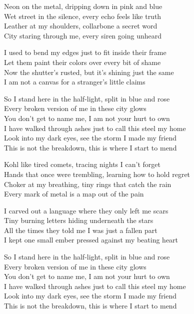\begin{lyrics}
Neon on the metal, dripping down in pink and blue\\
Wet street in the silence, every echo feels like truth\\
Leather at my shoulders, collarbone a secret word\\
City staring through me, every siren going unheard

I used to bend my edges just to fit inside their frame\\
Let them paint their colors over every bit of shame\\
Now the shutter’s rusted, but it’s shining just the same\\
I am not a canvas for a stranger’s little claims

So I stand here in the half-light, split in blue and rose\\
Every broken version of me in these city glows\\
You don’t get to name me, I am not your hurt to own\\
I have walked through ashes just to call this steel my home\\
Look into my dark eyes, see the storm I made my friend\\
This is not the breakdown, this is where I start to mend

Kohl like tired comets, tracing nights I can’t forget\\
Hands that once were trembling, learning how to hold regret\\
Choker at my breathing, tiny rings that catch the rain\\
Every mark of metal is a map out of the pain

I carved out a language where they only left me scars\\
Tiny burning letters hiding underneath the stars\\
All the times they told me I was just a fallen part\\
I kept one small ember pressed against my beating heart

So I stand here in the half-light, split in blue and rose\\
Every broken version of me in these city glows\\
You don’t get to name me, I am not your hurt to own\\
I have walked through ashes just to call this steel my home\\
Look into my dark eyes, see the storm I made my friend\\
This is not the breakdown, this is where I start to mend


\end{lyrics}
